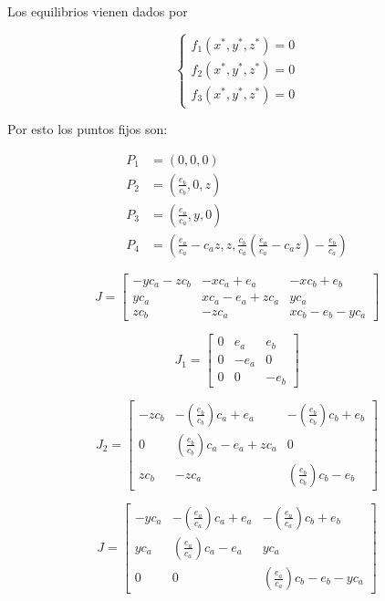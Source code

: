 \documentclass[twocolumn,aps,prl]{revtex4-1}
\begin{document}
Los equilibrios vienen dados por 

$$
\left\{
\begin{aligned}
    f_1(x^*, y^*, z^*) = 0\\ 
    f_2(x^*, y^*, z^*) = 0\\ 
    f_3(x^*, y^*, z^*) = 0   
\end{aligned}
\right.
$$

Por esto los puntos fijos son:

$$
\begin{aligned}
    P_1 &= (0, 0, 0) \\ 
    P_2 &= (\frac{e_b}{c_b}, 0, z) \\ 
    P_3 &= (\frac{e_a}{c_a}, y, 0) \\ 
    P_4 &= (\frac{e_a}{c_a} - c_a z, z, \frac{c_b}{c_a} (\frac{e_a}{c_a} - c_a z) - \frac{e_b}{c_a}) 
\end{aligned}
$$


$$
J = 
\begin{bmatrix}  
    - y c_a - z c_b & - x c_a + e_a & - x c_b + e_b \\
    y c_a & x c_a - e_a + z c_a & y c_a \\
    z c_b & - z c_a & x c_b - e_b - y c_a 
\end{bmatrix}
$$

$$
J_1 = 
\begin{bmatrix}
    0 & e_a & e_b \\
    0 & - e_a & 0 \\
    0 & 0 & - e_b 
\end{bmatrix}
$$

$$
J_2 = 
\begin{bmatrix}  
    - z c_b & - (\frac{e_b}{c_b}) c_a + e_a & - (\frac{e_b}{c_b}) c_b + e_b \\
    0 & (\frac{e_b}{c_b}) c_a - e_a + z c_a & 0 \\
    z c_b & - z c_a & (\frac{e_b}{c_b}) c_b - e_b
\end{bmatrix}
$$


$$
J = 
\begin{bmatrix}  
    - y c_a & - (\frac{e_a}{c_a}) c_a + e_a & - (\frac{e_a}{c_a}) c_b + e_b \\
    y c_a & (\frac{e_a}{c_a}) c_a - e_a  & y c_a \\
    0 & 0 & (\frac{e_a}{c_a}) c_b - e_b - y c_a 
\end{bmatrix}
$$

% 
%                             
% 
\end{document}

